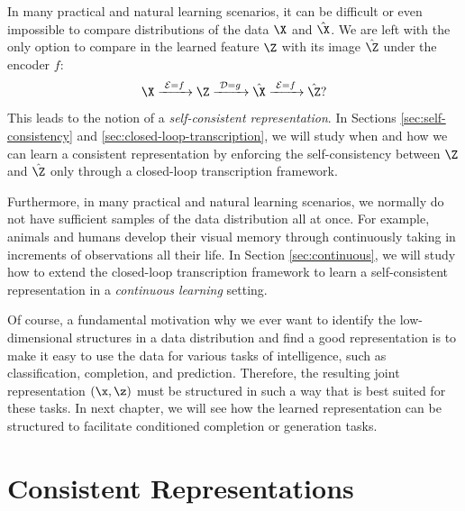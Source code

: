 \documentclass[../../book-main.tex]{subfiles}
\begin{document}
In many practical and natural learning scenarios, it can be difficult or even impossible to compare distributions of the data $\X$ and $\hat \X$. We are left with the only option to compare in the learned feature $\Z$ with its image $\hat \Z$ under the encoder $f$: 
\begin{equation}
 \X
\xrightarrow{\hspace{1mm} \mathcal{E} = f \hspace{1mm}} \Z  \xrightarrow{\hspace{1mm} \mathcal{D} = g \hspace{1mm}} \hat{\X} \xrightarrow{\hspace{1mm} \mathcal{E} = f \hspace{1mm}} \hat \Z?
\label{eqn:closed-autoencoding}
\end{equation}
This leads to the notion of a {\em self-consistent representation}. In Sections \ref{sec:self-consistency} and \ref{sec:closed-loop-transcription}, we will study when and how we can learn a consistent representation by enforcing the self-consistency between $\Z$ and $\hat \Z$ only through a closed-loop transcription framework. 

Furthermore, in many practical and natural learning scenarios, we normally do not have sufficient samples of the data distribution all at once. For example, animals and humans develop their visual memory through continuously taking in increments of observations all their life. In Section \ref{sec:continuous}, we will study how to extend the closed-loop transcription framework to learn a self-consistent representation in a  {\em continuous learning} setting.

Of course, a fundamental motivation why we ever want to identify the
low-dimensional structures in a data distribution and find a good
representation is to make it easy to use the data for various tasks
of intelligence, such as classification, completion, and prediction.
Therefore, the resulting joint representation $(\x, \z)$ must be
structured in such a way that is best suited for these tasks. In
next chapter, we will
see how the learned representation can be structured to facilitate
conditioned completion or generation tasks.

\section{Consistent Representations}\label{sec:consistent-representation}
\end{document}
